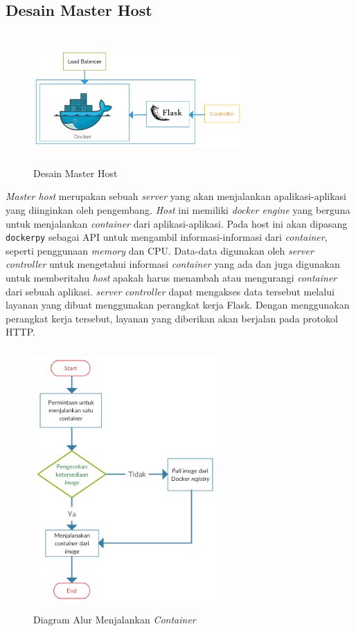 		\subsection{Desain Master Host}
        	\begin{figure}[H]
				\centering
				\includegraphics[width=8cm,height=5cm]{Images/C-3/masterhost.png}
				\caption{Desain Master Host}
				\label{desain:masterhost}
			\end{figure}
            \textit{Master host} merupakan sebuah \textit{server} yang akan menjalankan apalikasi-aplikasi yang diinginkan oleh pengembang. \textit{Host} ini memiliki \textit{docker engine} yang berguna untuk menjalankan \textit{container} dari aplikasi-aplikasi. Pada host ini akan dipasang \texttt{dockerpy} sebagai API untuk mengambil informasi-informasi dari \textit{container}, seperti penggunaan \textit{memory} dan CPU. Data-data digunakan oleh \textit{server controller} untuk mengetahui informasi \textit{container} yang ada dan juga digunakan untuk memberitahu \textit{host} apakah harus menambah atau mengurangi \textit{container} dari sebuah aplikasi. \textit{server controller} dapat mengakses data tersebut melalui layanan yang dibuat menggunakan perangkat kerja Flask. Dengan menggunakan perangkat kerja tersebut, layanan yang diberikan akan berjalan pada protokol HTTP. \\
            \begin{figure}[H]
				\centering
				\includegraphics[width=7cm,height=10cm]{Images/C-3/createcontainer.png}
				\caption{Diagram Alur Menjalankan \textit{Container}}
				\label{createcontainer}
			\end{figure}
